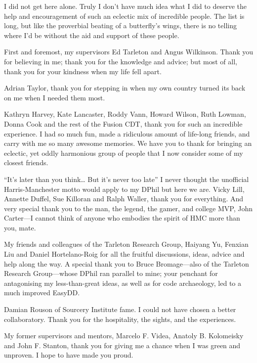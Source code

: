 \begin{frontmatter}[Acknowledgements]

    \begin{justify}
        I did not get here alone. Truly I don't have much idea what I did to deserve the help and encouragement of such an eclectic mix of incredible people. The list is long, but like the proverbial beating of a butterfly's wings, there is no telling where I'd be without the aid and support of these people.

        First and foremost, my supervisors Ed Tarleton and Angus Wilkinson. Thank you for believing in me; thank you for the knowledge and advice; but most of all, thank you for your kindness when my life fell apart.

        Adrian Taylor, thank you for stepping in when my own country turned its back on me when I needed them most.

        Kathryn Harvey, Kate Lancaster, Roddy Vann, Howard Wilson, Ruth Lowman, Donna Cook and the rest of the Fusion CDT, thank you for such an incredible experience. I had so much fun, made a ridiculous amount of life-long friends, and carry with me so many awesome memories. We have you to thank for bringing an eclectic, yet oddly harmonious group of people that I now consider some of my closest friends.

        ``It's later than you think\ldots{} But it's never too late'' I never thought the unofficial Harris-Manchester motto would apply to my DPhil but here we are. Vicky Lill, Annette Duffel, Sue Killoran and Ralph Waller, thank you for everything. And very special thank you to the man, the legend, the gamer, and college MVP, John Carter---I cannot think of anyone who embodies the spirit of HMC more than you, mate.

        My friends and colleagues of the Tarleton Research Group, Haiyang Yu, Fenxian Liu and Daniel Hortelano-Roig for all the fruitful discussions, ideas, advice and help along the way. A special thank you to Bruce Bromage---also of the Tarleton Research Group---whose DPhil ran parallel to mine; your penchant for antagonising my less-than-great ideas, as well as for code archaeology, led to a much improved EasyDD.

        Damian Rouson of Sourcery Institute fame. I could not have chosen a better collaboratory. Thank you for the hospitality, the sights, and the experiences.

        My former supervisors and mentors, Marcelo F. Videa, Anatoly B. Kolomeisky and John F. Stanton, thank you for giving me a chance when I was green and unproven. I hope to have made you proud.


\end{justify}
\end{frontmatter}
